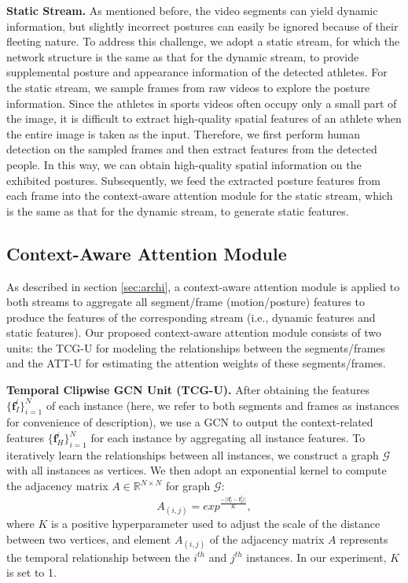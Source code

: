 \documentclass[sigconf]{acmart}
\begin{document}
\vspace{5pt}

\noindent\textbf{Static Stream.} As mentioned before, the video segments can yield dynamic information, but slightly incorrect postures can easily be ignored because of their fleeting nature. To address this challenge, we adopt a static stream, for which the network structure is the same as that for the dynamic stream, to provide supplemental posture and appearance information of the detected athletes. For the static stream, we sample frames from raw videos to explore the posture information. Since the athletes in sports videos often occupy only a small part of the image, it is difficult to extract high-quality spatial features of an athlete when the entire image is taken as the input. Therefore, we first perform human detection on the sampled frames and then extract features from the detected people. In this way, we can obtain high-quality spatial information on the exhibited postures. Subsequently, we feed the extracted posture features from each frame into the context-aware attention module for the static stream, which is the same as that for the dynamic stream, to generate static features.

\vspace{-0.1cm}
\subsection{Context-Aware Attention Module} \label{sec:attention}

As described in section \ref{sec:archi}, a context-aware attention module is applied to both streams to aggregate all segment/frame (motion/posture) features to produce the features of the corresponding stream (i.e., dynamic features and static features). Our proposed context-aware attention module consists of two units: the TCG-U for modeling the relationships between the segments/frames and the ATT-U for estimating the attention weights of these segments/frames.

\vspace{5pt}

\noindent\textbf{Temporal Clipwise GCN Unit (TCG-U).} After obtaining the features $\{\mathbf{f}_I^i\}_{i=1}^N$ of each instance (here, we refer to both segments and frames as instances for convenience of description), we use a GCN to output the context-related features $\{\mathbf{f}_H^i\}_{i=1}^N$ for each instance by aggregating all instance features. To iteratively learn the relationships between all instances, we construct a graph $\mathcal{G}$ with all instances as vertices. We then adopt an exponential kernel \cite{zhong2019graph} to compute the adjacency matrix $A \in \mathbb{R}^{N\times N}$ for graph $\mathcal{G}$:
\begin{equation}
A_{(i,j)} = exp^{\frac{-||\mathbf{f}_I^i-\mathbf{f}_I^j||}{K}},
\end{equation}
where $K$ is a positive hyperparameter used to adjust the scale of the distance between two vertices, and element $A_{(i,j)}$ of the adjacency matrix $A$ represents the temporal relationship between the $i^{th}$ and $j^{th}$ instances. In our experiment, $K$ is set to 1.
\end{document}
